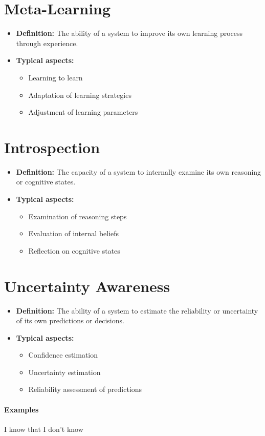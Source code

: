 \documentclass[a4paper]{article}
\begin{document}
    
    \section{Meta-Learning}
    \begin{itemize}
        \item \textbf{Definition:} The ability of a system to improve its own learning process through experience.
        \item \textbf{Typical aspects:}
        \begin{itemize}
            \item Learning to learn
            \item Adaptation of learning strategies
            \item Adjustment of learning parameters
        \end{itemize}
    \end{itemize}
    
    
    \section{Introspection}
    \begin{itemize}
        \item \textbf{Definition:} The capacity of a system to internally examine its own reasoning or cognitive states.
        \item \textbf{Typical aspects:}
        \begin{itemize}
            \item Examination of reasoning steps
            \item Evaluation of internal beliefs
            \item Reflection on cognitive states
        \end{itemize}
    \end{itemize}
    
    
    \section{Uncertainty Awareness}
    \begin{itemize}
        \item \textbf{Definition:} The ability of a system to estimate the reliability or uncertainty of its own predictions or decisions.
        \item \textbf{Typical aspects:}
        \begin{itemize}
            \item Confidence estimation
            \item Uncertainty estimation
            \item Reliability assessment of predictions
        \end{itemize}
    \end{itemize}
    
    \paragraph{Examples}
        I know that I don't know
        
        
\end{document}
